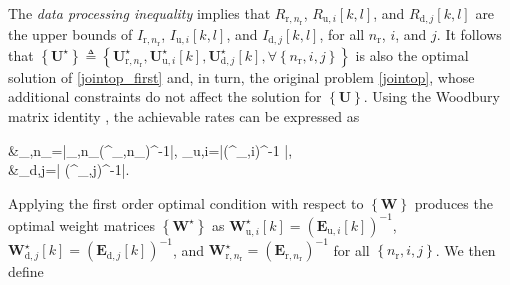 \documentclass[10pt,journal]{IEEEtran}
\newcommand{\paren}[1]{\left({#1}\right)}
\newcommand{\bracket}[1]{{\left [{#1}\right ]}}
\newcommand{\braces}[1]{{\left\{ {#1}\right\}}}
\newcommand{\rr}{_\mathrm{r}}
\newcommand{\rnr}{_{\mathrm{r},n_\mathrm{r}}}
\newcommand{\target}{\mathrm{t}}
\newcommand{\EiBn}{\mathbf{E}_{\textrm{u},i}\bracket{k}}
\newcommand{\EBjone}{\mathbf{E}_{\textrm{d},j}\bracket{k}}
\newcommand{\WBjop}{\mathbf{W}^\star_{\mathrm{d},j}\bracket{k}}
\theoremstyle{definition}
\begin{document}
\begin{IEEEproof}
		The \textit{data processing inequality} \cite[p.34]{cover2006elements} implies that $\mathit{R}_{\mathrm{r}, n\rr}$, $\mathit{R}_{\textrm{u},i}\bracket{k,l}$, and $\mathit{R}_{\textrm{d},j}\bracket{k,l}$ are the upper bounds of $\mathit{I}_{\mathrm{r},n\rr}$,  $\mathit{I}_{\mathrm{u},i}\bracket{k,l}$, and $\mathit{I}_{\mathrm{d},j}\bracket{k,l}$, for all $n\rr$, $i$, and $j$. It follows that $\braces{\mathbf{U}^\star}\triangleq\braces{\mathbf{U}^\star\rnr, \mathbf{U}^\star_{\textrm{u},i}\bracket{k},\mathbf{U}^\star_{\textrm{d},j}\bracket{k},\forall \braces{n\rr,i,j}}$ is also the optimal solution of \eqref{jointop_first} and, in turn, the original problem \eqref{jointop}, whose additional constraints do not affect the solution for $\braces{\mathbf{U}}$.  Using the Woodbury matrix identity \cite{IMM2012-03274}, the achievable rates can be expressed as  \par\noindent\small
		\begin{flalign}
			&_{,n\rr}=\log\left|\boldsymbol{\Sigma}_{\target,n\rr}\paren{^{\star}\rnr}^{-1}\right|, \;_{\textrm{u},i}\bracket{k}=\log\left|\paren{^{\star}_{,i}\bracket{k}}^{-1} \right|,\nonumber\\
			&_{\textrm{d},j}\bracket{k}=\log\left| \paren{^{\star}_{,j}\bracket{k}}^{-1}\right|.
		\end{flalign}\normalsize
		Applying the first order optimal condition \cite{Lui2006subg} with respect to $\braces{\mathbf{W}}$ produces the optimal weight matrices $\braces{\mathbf{W}^\star}$ as $\mathbf{W}^\star_{\textrm{u},i}\bracket{k}=\paren{\EiBn}^{-1}$, $\WBjop=\paren{\EBjone}^{-1}$, and $\mathbf{W}^\star\rnr=\paren{\mathbf{E}\rnr}^{-1}$ for all $\braces{n\rr,i,j}$. We then define\par\noindent\small
		\iffalse
		\begin{flalign}\label{XiMSEPrime}

\end{flalign}
\end{IEEEproof}
\end{document}

